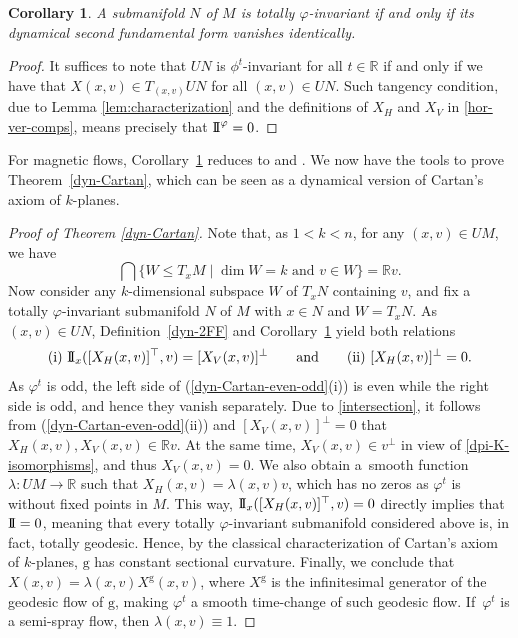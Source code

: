 \documentclass[pdftex]{sigma}
\newcommand{\g}{\mathrm{g}}
\newcommand{\R}{\mathbb{R}}
\numberwithin{equation}{section}
\newtheorem{Corollary}[Theorem]{Corollary}
\theoremstyle{definition}
\begin{document}
\begin{Corollary} \label{thm:characterization-dynamical-second-fund-form}
 A submanifold $N$ of $M$ is totally $\varphi$-invariant if and only if its dynamical second fundamental form vanishes identically.
\end{Corollary}

\begin{proof}
 It suffices to note that $UN$ is $\phi^t$-invariant for all $t\in \R$ if and only if we have that $X(x,v) \in T_{(x,v)}UN$ for all $(x,v)\in UN$. Such tangency condition, due to Lemma \ref{lem:characterization} and the definitions of $X_H$ and $X_V$ in \eqref{hor-ver-comps}, means precisely that ${\rm I\!I}^\varphi = 0$.
\end{proof}

For magnetic flows, Corollary~\ref{thm:characterization-dynamical-second-fund-form} reduces to \cite[Theorem~1.4]{ABM_2025} and \cite[Remark~4.2\,(i)]{terek2025submanifold}.
We now have the tools to prove Theorem~\ref{dyn-Cartan}, which can be seen as a dynamical version of Cartan's axiom of $k$-planes.

\begin{proof}[Proof of Theorem \ref{dyn-Cartan}]
 Note that, as $1< k<n$, for any $(x,v)\in UM$, we have
 \begin{equation}\label{intersection}
 \bigcap \{ W \leqslant T_xM \mid \dim W=k\mbox{ and }v\in W\} = \R v.
 \end{equation}Now consider any $k$-dimensional subspace $W$ of $T_xN$ containing $v$, and fix a totally \mbox{$\varphi$-in\-va\-ri\-ant} submanifold $N$ of $M$ with $x\in N$ and $W=T_xN$. As $(x,v) \in UN$, Definition~\ref{dyn-2FF} and Corollary~\ref{thm:characterization-dynamical-second-fund-form} yield both relations \begin{equation}\label{dyn-Cartan-even-odd}
 {\rm (i)}~ {\rm I\!I}_x( [X_H(x,v)]^\top, v) = [X_V(x,v)]^\perp \qquad\mbox{and}\qquad {\rm (ii)}~[X_H(x,v)]^\perp = 0 .
 \end{equation}As $\varphi^t$ is odd, the left side of (\ref{dyn-Cartan-even-odd}(i)) is even while the right side is odd, and hence they vanish separately. Due to \eqref{intersection}, it follows from \mbox{(\ref{dyn-Cartan-even-odd}(ii))} and $[X_V(x,v)]^\perp = 0$ that \mbox{$X_H(x,v),X_V(x,v) \in \R v$}. At the same time, \mbox{$X_V(x,v) \in v^\perp$} in view of \eqref{dpi-K-isomorphisms}, and thus $X_V(x,v)=0$. We also obtain a~smooth function $\lambda\colon UM\to \R$ such that $X_H(x,v)= \lambda(x,v)v$, which has no zeros as $\varphi^t$ is without fixed points in $M$. This way, ${\rm I\!I}_x( [X_H(x,v)]^\top, v) = 0$ directly implies that ${\rm I\!I}=0$, meaning that every totally $\varphi$-invariant submanifold considered above is, in fact, totally geodesic. Hence, by the classical characterization of Cartan's axiom of $k$-planes, $\g$ has constant sectional curvature. Finally, we conclude that $X(x,v) = \lambda(x,v) X^\g(x,v)$, where $X^\g$ is the infinitesimal generator of the geodesic flow of $\g$, making $\varphi^t$ a smooth time-change of such geodesic flow. If~$\varphi^t$ is a semi-spray flow, then $\lambda(x,v) \equiv 1$.
\end{proof}
\end{document}
